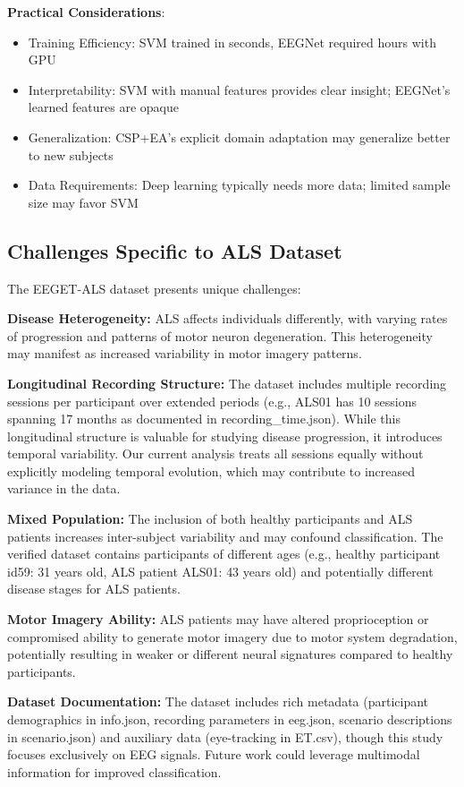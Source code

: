 \documentclass[conference]{IEEEtran}
\begin{document}
\textbf{Practical Considerations}:
\begin{itemize}
    \item Training Efficiency: SVM trained in seconds, EEGNet required hours with GPU
    \item Interpretability: SVM with manual features provides clear insight; EEGNet's learned features are opaque
    \item Generalization: CSP+EA's explicit domain adaptation may generalize better to new subjects
    \item Data Requirements: Deep learning typically needs more data; limited sample size may favor SVM
\end{itemize}

\subsection{Challenges Specific to ALS Dataset}

The EEGET-ALS dataset presents unique challenges:

\textbf{Disease Heterogeneity:} ALS affects individuals differently, with varying rates of progression and patterns of motor neuron degeneration. This heterogeneity may manifest as increased variability in motor imagery patterns.

\textbf{Longitudinal Recording Structure:} The dataset includes multiple recording sessions per participant over extended periods (e.g., ALS01 has 10 sessions spanning 17 months as documented in recording\_time.json). While this longitudinal structure is valuable for studying disease progression, it introduces temporal variability. Our current analysis treats all sessions equally without explicitly modeling temporal evolution, which may contribute to increased variance in the data.

\textbf{Mixed Population:} The inclusion of both healthy participants and ALS patients increases inter-subject variability and may confound classification. The verified dataset contains participants of different ages (e.g., healthy participant id59: 31 years old, ALS patient ALS01: 43 years old) and potentially different disease stages for ALS patients.

\textbf{Motor Imagery Ability:} ALS patients may have altered proprioception or compromised ability to generate motor imagery due to motor system degradation, potentially resulting in weaker or different neural signatures compared to healthy participants.

\textbf{Dataset Documentation:} The dataset includes rich metadata (participant demographics in info.json, recording parameters in eeg.json, scenario descriptions in scenario.json) and auxiliary data (eye-tracking in ET.csv), though this study focuses exclusively on EEG signals. Future work could leverage multimodal information for improved classification.
\end{document}
